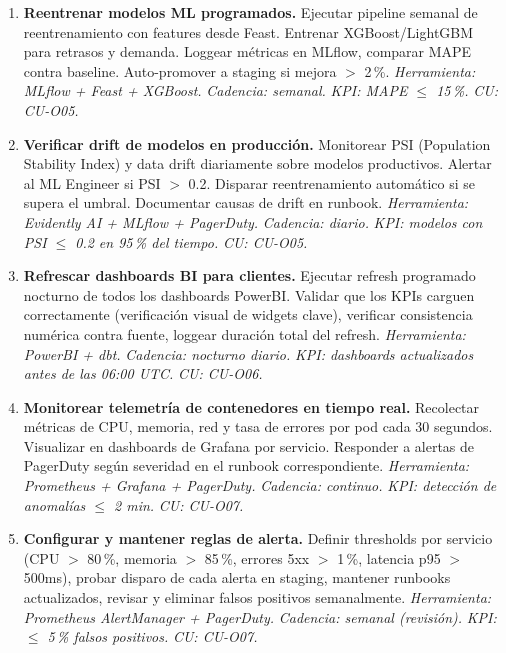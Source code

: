 ﻿\documentclass[11pt, letterpaper]{article}
\begin{document}
\begin{enumerate}[leftmargin=1.5cm, label=\textbf{OP\arabic*}, itemsep=2pt, topsep=4pt]
    \item \textbf{Reentrenar modelos ML programados.} Ejecutar pipeline semanal de reentrenamiento con features desde Feast. Entrenar XGBoost/LightGBM para retrasos y demanda. Loggear métricas en MLflow, comparar MAPE contra baseline. Auto-promover a staging si mejora $>$ 2\,\%. \textit{Herramienta: MLflow + Feast + XGBoost.} \textit{Cadencia: semanal.} \textit{KPI: MAPE $\leq$ 15\,\%.} \textit{CU: CU-O05.}



    \item \textbf{Verificar drift de modelos en producción.} Monitorear PSI (Population Stability Index) y data drift diariamente sobre modelos productivos. Alertar al ML Engineer si PSI $>$ 0.2. Disparar reentrenamiento automático si se supera el umbral. Documentar causas de drift en runbook. \textit{Herramienta: Evidently AI + MLflow + PagerDuty.} \textit{Cadencia: diario.} \textit{KPI: modelos con PSI $\leq$ 0.2 en 95\,\% del tiempo.} \textit{CU: CU-O05.}



    \item \textbf{Refrescar dashboards BI para clientes.} Ejecutar refresh programado nocturno de todos los dashboards PowerBI. Validar que los KPIs carguen correctamente (verificación visual de widgets clave), verificar consistencia numérica contra fuente, loggear duración total del refresh. \textit{Herramienta: PowerBI + dbt.} \textit{Cadencia: nocturno diario.} \textit{KPI: dashboards actualizados antes de las 06:00 UTC.} \textit{CU: CU-O06.}



    \item \textbf{Monitorear telemetría de contenedores en tiempo real.} Recolectar métricas de CPU, memoria, red y tasa de errores por pod cada 30 segundos. Visualizar en dashboards de Grafana por servicio. Responder a alertas de PagerDuty según severidad en el runbook correspondiente. \textit{Herramienta: Prometheus + Grafana + PagerDuty.} \textit{Cadencia: continuo.} \textit{KPI: detección de anomalías $\leq$ 2 min.} \textit{CU: CU-O07.}



    \item \textbf{Configurar y mantener reglas de alerta.} Definir thresholds por servicio (CPU $>$ 80\,\%, memoria $>$ 85\,\%, errores 5xx $>$ 1\,\%, latencia p95 $>$ 500ms), probar disparo de cada alerta en staging, mantener runbooks actualizados, revisar y eliminar falsos positivos semanalmente. \textit{Herramienta: Prometheus AlertManager + PagerDuty.} \textit{Cadencia: semanal (revisión).} \textit{KPI: $\leq$ 5\,\% falsos positivos.} \textit{CU: CU-O07.}




\end{enumerate}
\end{document}

